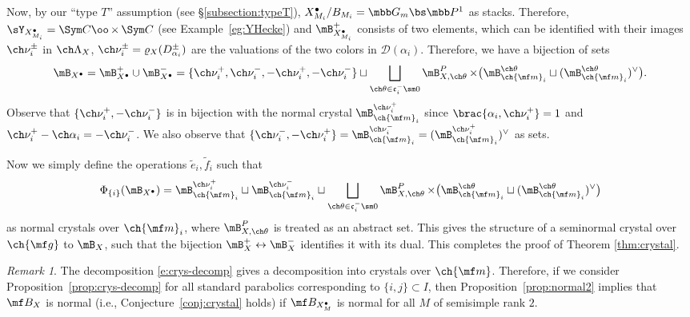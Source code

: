 \documentclass[final]{amsart}
\theoremstyle{remark}
\newtheorem{rem}[subsubsection]{Remark}
\theoremstyle{definition}
\DeclareMathOperator*{\xt}{\times}
\numberwithin{equation}{section}
\begin{document}
Now, by our ``type $T$'' assumption (see \S \ref{subsection:typeT}), $X_{M_i}^\bullet / B_{M_i} = \mbb G_m \bs \mbb P^1$ as stacks. 
Therefore, $\sY_{X_{M_i}^\bullet} = \Sym C \oo\xt \Sym C$ (see Example~\ref{eg:YHecke}) 
and $\mB_{X_{M_i}^\bullet}^+$ consists of two elements, which can be identified with their images $\ch\nu_i^{\pm}$ in $\ch\Lambda_X$, 
$\ch\nu_i^\pm = \varrho_X( D_{\alpha_i}^\pm )$ are the valuations of the two colors in $\mathcal D(\alpha_i)$.
Therefore, we have a bijection of sets 
\[ \mB_{X^\bullet} = \mB^+_{X^\bullet} \cup \mB^-_{X^\bullet} = \{ \ch\nu_i^+, \ch\nu_i^-, -\ch\nu_i^+, -\ch\nu_i^- \} \sqcup \bigsqcup_{\ch\theta \in \mathfrak c_i^-\sm 0} 
\mB^P_{X,\ch\theta} \xt \bigl( 
\mB^{\ch\theta}_{\ch{\mf m}_i} \sqcup (\mB^{\ch\theta}_{\ch{\mf m}_i})^\vee \bigr).
\]
Observe that $\{\ch\nu_i^+, -\ch\nu_i^-\}$ is in bijection with 
the normal crystal $\mB_{\ch{\mf m}_i}^{\ch\nu_i^+}$ since $\brac{\alpha_i,\ch\nu_i^+}=1$
and $\ch\nu_i^+ - \ch\alpha_i = -\ch\nu_i^-$. 
We also observe that $\{ \ch\nu_i^-, -\ch\nu_i^+\} = \mB_{\ch{\mf m}_i}^{\ch\nu_i^-} = 
(\mB_{\ch{\mf m}_i}^{\ch\nu_i^+})^\vee$ as sets. 

Now we simply define the operations $\tilde e_i, \tilde f_i$ such that 
\begin{equation}\label{e:iselfdual}
    \Phi_{\{i\}}(\mB_{X^\bullet}) = \mB_{\ch{\mf m}_i}^{\ch\nu_i^+} \sqcup 
    \mB_{\ch{\mf m}_i}^{\ch\nu_i^-} \sqcup 
    \bigsqcup_{\ch\theta \in \mathfrak c_i^-\sm 0} \mB^P_{X,\ch\theta} 
    \xt \bigl( 
    \mB^{\ch\theta}_{\ch{\mf m}_i} \sqcup (\mB^{\ch\theta}_{\ch{\mf m}_i})^\vee \bigr)
\end{equation}
as normal crystals over $\ch{\mf m}_i$, where $\mB^P_{X,\ch\theta}$ is treated as
an abstract set. 
This gives the structure of a seminormal 
crystal over $\ch{\mf g}$ to $\mB_X$, such that the bijection $\mB_X^+\leftrightarrow\mB_X^-$ identifies it with its dual. This completes the proof of Theorem \ref{thm:crystal}.

\begin{rem} \label{rem:conj2}
The decomposition \eqref{e:crys-decomp} gives a decomposition into crystals
over $\ch{\mf m}$. Therefore, if we consider Proposition~\ref{prop:crys-decomp}
for all standard parabolics corresponding to $\{i,j\} \subset I$, then 
Proposition~\ref{prop:normal2} implies that $\mf B_X$ is normal (i.e., Conjecture~\ref{conj:crystal} holds)  
if $\mf B_{X_M^\bullet}$ is normal for all $M$ of semisimple rank $2$. 
\end{rem}
\end{document}
